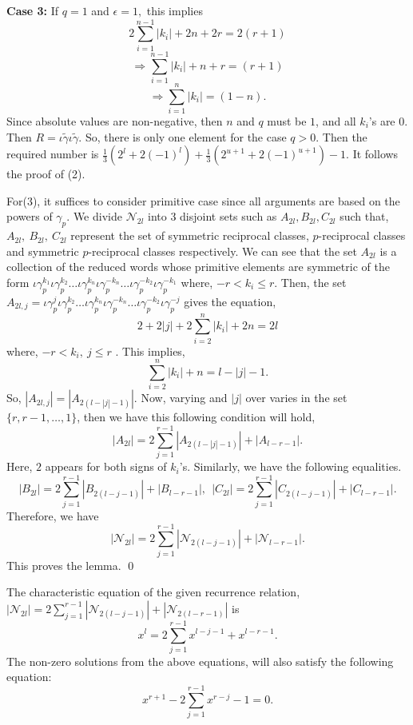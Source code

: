 \documentclass[11pt]{amsart}
\renewenvironment{proof}{{\bfseries Proof.}}{\qed}
\numberwithin{equation}{section}
\theoremstyle{definition}
\newcommand{\gt}{\tilde{\gamma}}
\newcommand{\tb}{\textbf}
\newcommand{\imp}{\Rightarrow}
\newcommand{\g}{\gamma_{p}}
\newcommand{\io}{\iota }
\numberwithin{equation}{section}
\begin{document}
\begin{proof}
			
			\tb{Case 3:} If $q=1$ and $\epsilon=1,$ this implies
			\[ 2\sum_{i=1}^{n-1}|k_{i}| +2n+2r= 2(r+1)\]
			\[\imp\sum_{i=1}^{n-1}|k_{i}| +n+r= (r+1)\]
			\[\imp \sum_{i=1}^{n}|k_{i}|=(1-n). \]
			Since absolute values are non-negative, then $n$ and $q$ must be $1$, and all $k_{i}$'s are $0.$ Then $R=\io\gt\io\gt$. So, there is only one element for the case $q>0.$		
			Then the required number is $\frac{ 1}{3}(2^{l}+2(-1)^{l})+\frac{ 1}{3}(2^{u+1}+2(-1)^{u+1})-1.$
			It follows the proof of (2).
			
			For(3), it suffices to consider primitive case since all arguments are based on the powers of $ \g .$ We divide $\mathcal{N}_{2l}$ into $3$ disjoint sets such as $A_{2l},B_{2l},C_{2l}$ such that,
			$A_{2l}, ~B_{2l},~C_{2l}$ represent the set of symmetric reciprocal classes, $p$-reciprocal classes and symmetric $p$-reciprocal classes respectively. We can see that the set $A_{2l}$ is a collection of the reduced words whose primitive elements are symmetric of the form  $  \io\g^{k_{1}}\io \g^{k_{2}}\dots \io \g^{k_{n}}\io \g^{-k_{n}}\dots\io \g^{-k_{2}}\io \g^{-k_{1}} $ where, $-r<k_{i}\leq r$. Then, the set $A_{2l,j}=\io\g^{j}\io \g^{k_{2}}\dots \io \g^{k_{n}}\io \g^{-k_{n}}\dots\io \g^{-k_{2}}\io \g^{-j}$  gives the equation,
			\[ 2+2|j|+2\sum_{i=2}^{n}|k_{i}|+2n=2l\]
			where, $-r<k_i,~ j\leq r$ .
			This implies, \[\sum_{i=2}^{n}|k_{i}|+n=l-|j|-1.\]
			So, $|A_{2l,j}|=|A_{2(l-|j|-1)}|$. Now, varying  and $|j|$ over varies in the set $ \{r,r-1,\dots, 1\} $, then we have this following condition will hold,
			\[|A_{2l}|=2\sum_{j=1}^{r-1}|A_{2(l-|j|-1)}|+|A_{l-r-1}|.\]
			Here, $ 2 $ appears for both signs of $k_{i}$'s.
			Similarly, we have the following equalities.
			$$|B_{2l}|=2\sum_{j=1}^{r-1}|B_{2(l-j-1)}|+|B_{l-r-1}|, ~~ |C_{2l}|=2\sum_{j=1}^{r-1}|C_{2(l-j-1)}|+|C_{l-r-1}|.$$ 
			Therefore, we have
			\[|\mathcal{N}_{2l}|=2\sum_{j=1}^{r-1}|\mathcal{N}_{2(l-j-1)}|+|\mathcal{N}_{l-r-1}|.\]
			This proves the lemma. 
		\end{proof}
		
		\medskip The characteristic equation of the given recurrence relation, 
		$|\mathcal{N}_{2l}|=2\sum_{j=1}^{r-1}|\mathcal{N}_{2(l-j-1)}|+|\mathcal{N}_{2(l-r-1)}|$ is
		\begin{equation}
			x^{l}=2\sum_{j=1}^{r-1}x^{l-j-1}+x^{l-r-1}.
		\end{equation} The non-zero solutions from the above equations, will also satisfy the following equation:
		\begin{equation} \label{re} x^{r+1}-2\sum_{j=1}^{r-1}x^{r-j}-1=0.\end{equation} 
		
\end{document}
